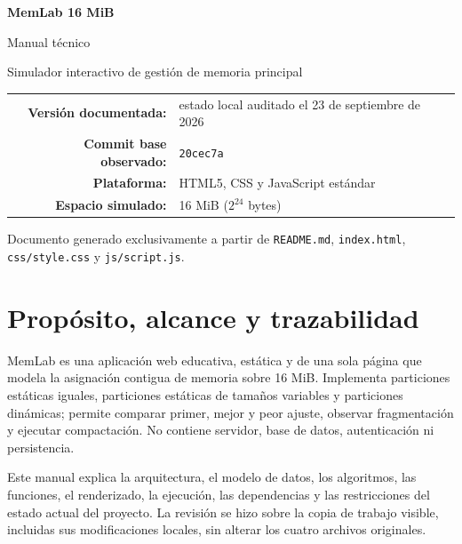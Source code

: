 \documentclass[11pt,a4paper]{article}
\newcommand{\archivo}[1]{\texttt{#1}}
\begin{document}
\begin{titlepage}
  \centering
  \vspace*{2.0cm}
  {\sffamily\bfseries\fontsize{34}{39}\selectfont\color{MemBlue} MemLab 16 MiB\par}
  \vspace{0.5cm}
  {\sffamily\fontsize{23}{28}\selectfont Manual técnico\par}
  \vspace{0.8cm}
  {\Large Simulador interactivo de gestión de memoria principal\par}
  \vfill
  \begin{tabular}{rl}
    \textbf{Versión documentada:} & estado local auditado el 23 de septiembre de 2026\\
    \textbf{Commit base observado:} & \texttt{20cec7a}\\
    \textbf{Plataforma:} & HTML5, CSS y JavaScript estándar\\
    \textbf{Espacio simulado:} & 16 MiB (\(2^{24}\) bytes)\\
  \end{tabular}
  \vfill
  {\small Documento generado exclusivamente a partir de \archivo{README.md},
  \archivo{index.html}, \archivo{css/style.css} y \archivo{js/script.js}.\par}
\end{titlepage}

\tableofcontents
\newpage

\section{Propósito, alcance y trazabilidad}

\begin{resumen}
MemLab es una aplicación web educativa, estática y de una sola página que modela
la asignación contigua de memoria sobre 16 MiB. Implementa particiones estáticas
iguales, particiones estáticas de tamaños variables y particiones dinámicas;
permite comparar primer, mejor y peor ajuste, observar fragmentación y ejecutar
compactación. No contiene servidor, base de datos, autenticación ni persistencia.
\end{resumen}

Este manual explica la arquitectura, el modelo de datos, los algoritmos, las
funciones, el renderizado, la ejecución, las dependencias y las restricciones del
estado actual del proyecto. La revisión se hizo sobre la copia de trabajo visible,
incluidas sus modificaciones locales, sin alterar los cuatro archivos originales.
\end{document}
